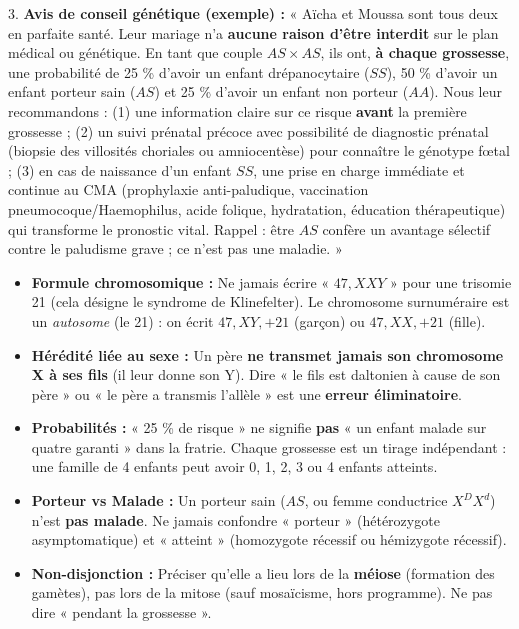 \documentclass[11pt]{article}
\begin{document}
\begin{exoresolu}
3. \textbf{Avis de conseil génétique (exemple) :}
« Aïcha et Moussa sont tous deux en parfaite santé. Leur mariage n'a \textbf{aucune raison d'être interdit} sur le plan médical ou génétique. En tant que couple $AS \times AS$, ils ont, \textbf{à chaque grossesse}, une probabilité de 25 \% d'avoir un enfant drépanocytaire ($SS$), 50 \% d'avoir un enfant porteur sain ($AS$) et 25 \% d'avoir un enfant non porteur ($AA$). Nous leur recommandons : (1) une information claire sur ce risque \textbf{avant} la première grossesse ; (2) un suivi prénatal précoce avec possibilité de diagnostic prénatal (biopsie des villosités choriales ou amniocentèse) pour connaître le génotype fœtal ; (3) en cas de naissance d'un enfant $SS$, une prise en charge immédiate et continue au CMA (prophylaxie anti-paludique, vaccination pneumocoque/Haemophilus, acide folique, hydratation, éducation thérapeutique) qui transforme le pronostic vital. Rappel : être $AS$ confère un avantage sélectif contre le paludisme grave ; ce n'est pas une maladie. »

\end{exoresolu}

\begin{attention}
\begin{itemize}
\item \textbf{Formule chromosomique :} Ne jamais écrire « $47,XXY$ » pour une trisomie 21 (cela désigne le syndrome de Klinefelter). Le chromosome surnuméraire est un \emph{autosome} (le 21) : on écrit \textbf{$47,XY,+21$} (garçon) ou \textbf{$47,XX,+21$} (fille).
\item \textbf{Hérédité liée au sexe :} Un père \textbf{ne transmet jamais son chromosome X à ses fils} (il leur donne son Y). Dire « le fils est daltonien à cause de son père » ou « le père a transmis l'allèle » est une \textbf{erreur éliminatoire}.
\item \textbf{Probabilités :} « 25 \% de risque » ne signifie \textbf{pas} « un enfant malade sur quatre garanti » dans la fratrie. Chaque grossesse est un tirage indépendant : une famille de 4 enfants peut avoir 0, 1, 2, 3 ou 4 enfants atteints.
\item \textbf{Porteur vs Malade :} Un porteur sain ($AS$, ou femme conductrice $X^D X^d$) n'est \textbf{pas malade}. Ne jamais confondre « porteur » (hétérozygote asymptomatique) et « atteint » (homozygote récessif ou hémizygote récessif).
\item \textbf{Non-disjonction :} Préciser qu'elle a lieu lors de la \textbf{méiose} (formation des gamètes), pas lors de la mitose (sauf mosaïcisme, hors programme). Ne pas dire « pendant la grossesse ».
\end{itemize}
\end{attention}
\end{document}
